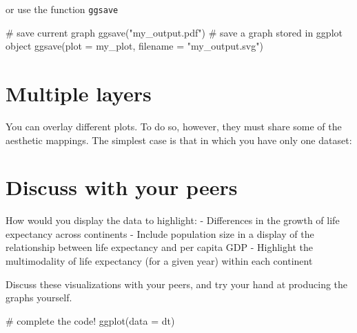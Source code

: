 \documentclass[
  letterpaper,
  DIV=11,
  numbers=noendperiod]{scrreprt}
\newenvironment{Shaded}{\begin{snugshade}}{\end{snugshade}}
\newcommand{\AttributeTok}[1]{\textcolor[rgb]{0.40,0.45,0.13}{#1}}
\newcommand{\CommentTok}[1]{\textcolor[rgb]{0.37,0.37,0.37}{#1}}
\newcommand{\FunctionTok}[1]{\textcolor[rgb]{0.28,0.35,0.67}{#1}}
\newcommand{\NormalTok}[1]{\textcolor[rgb]{0.00,0.23,0.31}{#1}}
\newcommand{\StringTok}[1]{\textcolor[rgb]{0.13,0.47,0.30}{#1}}
\begin{document}
or use the function \texttt{ggsave}

\begin{Shaded}
\begin{Highlighting}[]
\CommentTok{\# save current graph}
\FunctionTok{ggsave}\NormalTok{(}\StringTok{"my\_output.pdf"}\NormalTok{)}
\CommentTok{\# save a graph stored in ggplot object}
\FunctionTok{ggsave}\NormalTok{(}\AttributeTok{plot =}\NormalTok{ my\_plot, }\AttributeTok{filename =} \StringTok{"my\_output.svg"}\NormalTok{)}
\end{Highlighting}
\end{Shaded}

\section{Multiple layers}\label{multiple-layers}

You can overlay different plots. To do so, however, they must share some
of the aesthetic mappings. The simplest case is that in which you have
only one dataset:

\begin{Shaded}
\end{Shaded}

\section{Discuss with your peers}\label{discuss-with-your-peers}

How would you display the data to highlight: - Differences in the growth
of life expectancy across continents - Include population size in a
display of the relationship between life expectancy and per capita GDP -
Highlight the multimodality of life expectancy (for a given year) within
each continent

Discuss these visualizations with your peers, and try your hand at
producing the graphs yourself.

\begin{Shaded}
\begin{Highlighting}[]
\NormalTok{\# complete the code!}
\NormalTok{ggplot(data = dt) }
\end{Highlighting}
\end{Shaded}
\end{document}
